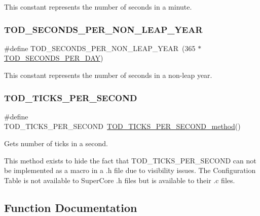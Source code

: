 This constant represents the number of seconds in a minute. \mbox{\label{group__RTEMSScoreTOD_ga645242ab0b8238dbeb24659653c99961}} 
\subsubsection{\texorpdfstring{TOD\_SECONDS\_PER\_NON\_LEAP\_YEAR}{TOD\_SECONDS\_PER\_NON\_LEAP\_YEAR}}
{\footnotesize\ttfamily \#define T\+O\+D\+\_\+\+S\+E\+C\+O\+N\+D\+S\+\_\+\+P\+E\+R\+\_\+\+N\+O\+N\+\_\+\+L\+E\+A\+P\+\_\+\+Y\+E\+AR~(365 $\ast$ \mbox{\hyperlink{group__RTEMSScoreTOD_gac064f77025e49ee110224ebde3fc72e7}{T\+O\+D\+\_\+\+S\+E\+C\+O\+N\+D\+S\+\_\+\+P\+E\+R\+\_\+\+D\+AY}})}

This constant represents the number of seconds in a non-\/leap year. \mbox{\label{group__RTEMSScoreTOD_ga00b749daf216fa5d13cc6ed43af0627a}} 
\subsubsection{\texorpdfstring{TOD\_TICKS\_PER\_SECOND}{TOD\_TICKS\_PER\_SECOND}}
{\footnotesize\ttfamily \#define T\+O\+D\+\_\+\+T\+I\+C\+K\+S\+\_\+\+P\+E\+R\+\_\+\+S\+E\+C\+O\+ND~\mbox{\hyperlink{group__RTEMSScoreTOD_ga8bcb0f19ff76e742900cc90ebe6a49bd}{T\+O\+D\+\_\+\+T\+I\+C\+K\+S\+\_\+\+P\+E\+R\+\_\+\+S\+E\+C\+O\+N\+D\+\_\+method}}()}



Gets number of ticks in a second. 

This method exists to hide the fact that T\+O\+D\+\_\+\+T\+I\+C\+K\+S\+\_\+\+P\+E\+R\+\_\+\+S\+E\+C\+O\+ND can not be implemented as a macro in a .h file due to visibility issues. The Configuration Table is not available to Super\+Core .h files but is available to their .c files. 

\subsection{Function Documentation}
\mbox{\label{group__RTEMSScoreTOD_ga672f574f652f79e2c365869a8c7b7895}} 
